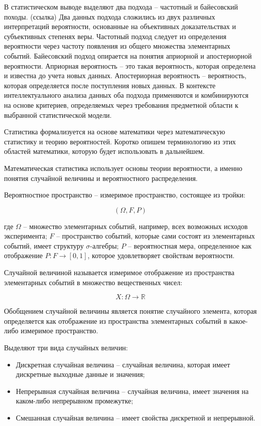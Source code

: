 В статистическом выводе выделяют два подхода -- частотный и байесовский походы. (ссылка)
Два данных подхода сложились из двух различных интерпретаций вероятности, основанные на объективных доказательствах
и субъективных степенях веры. Частотный подход следует из определения вероятности через частоту появления
из общего множества элементарных событий. Байесовский подход опирается на понятия априорной и апостериорной вероятности.
Априорная вероятность -- это такая вероятность, которая определена и известна до учета новых данных.
Апостериорная вероятность -- вероятность, которая определяется после поступления новых данных.
В контексте интеллектуального анализа данных оба подхода применяются и комбинируются
на основе критериев, определяемых через требования предметной области к выбранной статистической модели.

Статистика формализуется на основе математики через математическую статистику и теорию вероятностей.
Коротко опишем терминологию из этих областей математики, которую будет использовать в дальнейшем.

Математическая статистика использует основы теории вероятности, а именно понятия случайной величины и вероятностного распределения.

Вероятностное пространство -- измеримое пространство, состоящее из тройки:

\begin{equation}
    (\Omega, F, P )
\end{equation}

где $\Omega$ -- множество элементарных событий, например, всех возможных исходов эксперимента;
$F$ -- пространство событий, которые сами состоят из элементарных событий, имеет структуру $\sigma$-алгебры;
$P$ -- вероятностная мера, определенное как отображение $P: F\rightarrow [0,1]$, которое удовлетворяет свойствам вероятности.

Случайной величиной называется измеримое отображение из пространства элементарных событий в множество вещественных чисел:

\begin{equation}
    X: \Omega \rightarrow \mathbb{R}
\end{equation}

Обобщением случайной величины является понятие случайного элемента, которая определяется как отображение
из пространства элементарных событий в какое-либо измеримое пространство.

Выделяют три вида случайных величин:

\begin{itemize}
    \item Дискретная случайная величина -- случайная величина, которая имеет дискретные выходные данные и значения;
    \item Непрерывная случайная величина -- случайная величина, имеет значения на каком-либо непрерывном промежутке;
    \item Смешанная случайная величина -- имеет свойства дискретной и непрерывной.
\end{itemize}

